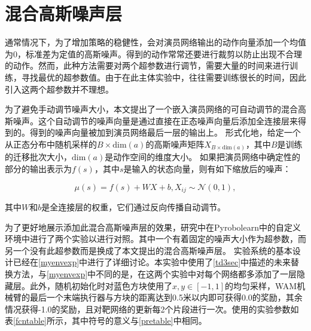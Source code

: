 \section{混合高斯噪声层}

通常情况下，为了增加策略的稳健性，会对演员网络输出的动作向量添加一个均值为0，标准差为定值的高斯噪声。得到的动作常常还要进行裁剪以防止出现不合理的动作。然而，此种方法需要对两个超参数进行调节，需要大量的时间来进行训练，寻找最优的超参数值。由于在此主体实验中，往往需要训练很长的时间，因此引入这两个超参数并不理想。
    
为了避免手动调节噪声大小，本文提出了一个嵌入演员网络的可自动调节的混合高斯噪声。这个自动调节的噪声向量是通过直接在正态噪声向量后添加全连接层来得到的。得到的噪声向量被加到演员网络最后一层的输出上。
形式化地，给定一个从正态分布中随机采样的$B\times \mathrm{dim}(a)$的高斯噪声矩阵$X_{B\times \mathrm{dim}(a)}$，其中$B$是训练的迁移批次大小，$\mathrm{dim}(a)$是动作空间的维度大小。
如果把演员网络中确定性的部分的输出表示为$f(s)$，其中$s$是输入的状态向量，则有如下缩放后的噪声：

    $$ \mu(s) = f(s) + W X + b, X_{ij}\sim\mathcal N(0,1),$$

    其中$W$和$b$是全连接层的权重，它们通过反向传播自动调节。

    为了更好地展示添加此混合高斯噪声层的效果，研究中在Pyrobolearn中的自定义环境中进行了两个实验以进行对照。其中一个有着固定的噪声大小作为超参数，而另一个没有此超参数而是换成了本文提出的混合高斯噪声层。
    实验系统的基本设计已经在\ref{myenvexp}中进行了详细讨论。本实验中使用了\ref{td3sec}中描述的未来替换方法，与\ref{myenvexp}中不同的是，在这两个实验中对每个网络都多添加了一层隐藏层。此外，随机初始化时对蓝色方块使用了$x,y\in[-1,1]$的均匀采样，WAM机械臂的最后一个末端执行器与方块的距离达到0.5米以内即可获得0.0的奖励，其余情况获得-1.0的奖励，且对靶网络的更新每2个片段进行一次。使用的实验参数如表\ref{fcntable}所示，其中符号的意义与\ref{pretable}中相同。

